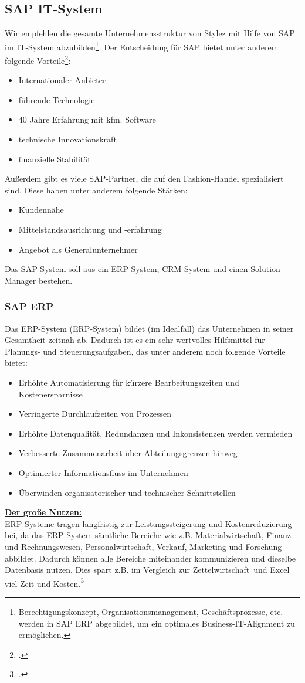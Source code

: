 \subsection{SAP IT-System}
Wir empfehlen die gesamte Unternehmensstruktur von Stylez mit Hilfe von SAP im IT-System abzubilden\footnote{Berechtigungskonzept, Organisationsmanagement, Geschäftsprozesse, etc. werden in SAP ERP abgebildet, um ein optimales Business-IT-Alignment zu ermöglichen.}. Der Entscheidung für SAP bietet unter anderem folgende Vorteile\footcite{SAP_Vorteil}:
\begin{itemize}
\item Internationaler Anbieter
\item führende Technologie
\item 40 Jahre Erfahrung mit kfm. Software
\item technische Innovationskraft
\item finanzielle Stabilität
\end{itemize}
Außerdem gibt es viele SAP-Partner, die auf den Fashion-Handel spezialisiert sind. Diese haben unter anderem folgende Stärken:
\begin{itemize}
\item Kundennähe
\item Mittelstandsausrichtung und -erfahrung
\item Angebot als Generalunternehmer
\end{itemize}
Das SAP System soll aus ein \acrshort{ERP}-System, \acrshort{CRM}-System und einen Solution Manager bestehen.
\subsubsection{SAP ERP}
Das \acrlong{ERP}-System (ERP-System) bildet (im Idealfall) das Unternehmen in seiner Gesamtheit zeitnah ab. Dadurch ist es ein sehr wertvolles Hilfsmittel für Planungs- und Steuerungsaufgaben, das unter anderem noch folgende Vorteile bietet:
\begin{itemize}
\item Erhöhte Automatisierung für kürzere Bearbeitungszeiten und Kostenersparnisse
\item Verringerte Durchlaufzeiten von Prozessen
\item Erhöhte Datenqualität, Redundanzen und Inkonsistenzen werden vermieden
\item Verbesserte Zusammenarbeit über Abteilungsgrenzen hinweg
\item Optimierter Informationsfluss im Unternehmen
\item Überwinden organisatorischer und technischer Schnittstellen
\end{itemize}
\underline{\textbf{Der große Nutzen:}}\\
ERP-Systeme tragen langfristig zur Leistungssteigerung und Kostenreduzierung bei, da das ERP-System sämtliche Bereiche wie z.B. Materialwirtschaft, Finanz- und Rechnungswesen, Personalwirtschaft, Verkauf, Marketing und Forschung abbildet. Dadurch können alle Bereiche miteinander kommunizieren und dieselbe Datenbasis nutzen. Dies spart z.B. im Vergleich zur \glqq Zettelwirtschaft\grqq~und Excel viel Zeit und Kosten.\footcite[vgl.][]{ERP}
